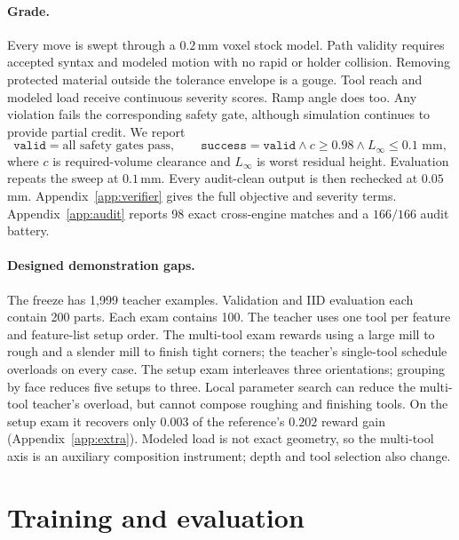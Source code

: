 \documentclass{article}
\newcommand{\validmetric}{\texttt{valid}}
\newcommand{\successmetric}{\texttt{success}}
\begin{document}
\paragraph{Grade.}
Every move is swept through a $0.2$\,mm voxel stock model.  Path
validity requires accepted syntax and modeled motion with no rapid or
holder collision. Removing protected material outside the tolerance envelope
is a gouge.  Tool reach and modeled load receive continuous severity
scores.  Ramp angle does too.  Any violation fails the corresponding
safety gate, although simulation continues to provide partial credit.
We report
\[
  \validmetric = \text{all safety gates pass}, \qquad
  \successmetric = \validmetric \wedge c\geq0.98
                    \wedge L_\infty\leq0.1\text{ mm},
\]
where $c$ is required-volume clearance and $L_\infty$ is worst residual
height.  Evaluation repeats the sweep at $0.1$\,mm.  Every audit-clean
output is then rechecked at $0.05$\,mm.
Appendix~\ref{app:verifier} gives the full objective and
severity terms.  Appendix~\ref{app:audit} reports 98 exact cross-engine
matches and a $166/166$ audit battery.

\paragraph{Designed demonstration gaps.}
The freeze has 1,999 teacher examples.  Validation and IID evaluation
each contain 200 parts.  Each exam contains 100.  The teacher uses one tool per feature
and feature-list setup order.  The multi-tool exam rewards using a
large mill to rough and a slender mill to finish tight corners; the
teacher's single-tool schedule overloads on every case.  The setup exam
interleaves three orientations; grouping by face reduces five setups
to three.  Local parameter search can reduce the multi-tool teacher's
overload, but cannot compose roughing and finishing tools.  On the
setup exam it recovers only $0.003$ of the reference's $0.202$ reward gain
(Appendix~\ref{app:extra}).  Modeled load is not exact geometry, so the
multi-tool axis is an auxiliary composition instrument; depth and tool
selection also change.

\section{Training and evaluation}
\label{sec:training}
\end{document}
